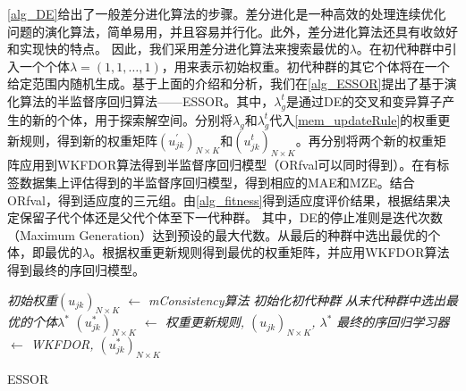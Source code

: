 \autoref{alg_DE}给出了一般差分进化算法的步骤。差分进化是一种高效的处理连续优化问题的演化算法，简单易用，并且容易并行化。此外，差分进化算法还具有收敛好和实现快的特点\citep{price2006differential}。
因此，我们采用差分进化算法来搜索最优的\(\lambda\)。在初代种群中引入一个个体\(\lambda=(1,1,\dots,1)\)，用来表示初始权重。初代种群的其它个体将在一个给定范围内随机生成。基于上面的介绍和分析，我们在\autoref{alg_ESSOR}提出了基于演化算法的半监督序回归算法——ESSOR。其中，\(\lambda_{g}^{t}\)是通过DE的交叉和变异算子产生的新的个体，用于探索解空间。分别将\(\lambda_{g}\)和\(\lambda_g^{t}\)代入\autoref{mem_updateRule}的权重更新规则，得到新的权重矩阵\((u_{jk}^{'})_{N \times K}\)和\((u_{jk}^{t})_{N \times K}\)。再分别将两个新的权重矩阵应用到WKFDOR算法得到半监督序回归模型（ORfval可以同时得到）。在有标签数据集上评估得到的半监督序回归模型，得到相应的MAE和MZE。结合ORfval，得到适应度的三元组。由\autoref{alg_fitness}得到适应度评价结果，根据结果决定保留子代个体还是父代个体至下一代种群。
其中，DE的停止准则是迭代次数（Maximum Generation）达到预设的最大代数。从最后的种群中选出最优的个体，即最优的\(\lambda\)。根据权重更新规则得到最优的权重矩阵，并应用WKFDOR算法得到最终的序回归模型。


\IncMargin{1em}
\begin{algorithm}
\emph{初始权重$(u_{jk})_{N \times K}$ $\leftarrow$ \textit{mConsistency}算法}\;
\emph{初始化初代种群}\;
\emph{从末代种群中选出最优的个体$\lambda^{*}$}\;
\emph{$(u_{jk}^{*})_{N \times K}$ $\leftarrow$ 权重更新规则, $(u_{jk})_{N \times K}$, $\lambda^{*}$}\;
\emph{最终的序回归学习器 $\leftarrow$ WKFDOR, $(u_{jk}^{*})_{N \times K}$}\;
\caption{ESSOR}\label{alg_ESSOR}
\end{algorithm}\DecMargin{1em}

